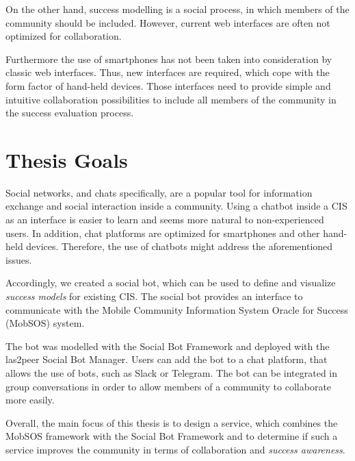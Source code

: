 On the other hand, success modelling is a social process, in which members of the community should be included. However, current web interfaces are often not optimized for collaboration.

Furthermore the use of smartphones has not been taken into consideration by classic web interfaces.
Thus, new interfaces are required, which cope with the form factor of hand-held devices. Those interfaces need to provide simple and intuitive collaboration possibilities to include all members of the community in the success evaluation process. 

\section{Thesis Goals}

Social networks, and chats specifically, are a popular tool for information exchange and social interaction inside a community.
Using a chatbot inside a CIS as an interface is easier to learn and seems more natural to non-experienced users.
In addition, chat platforms are optimized for smartphones and other hand-held devices. Therefore, the use of chatbots might address the aforementioned issues.

Accordingly, we created a social bot, which can be used to define and visualize \emph{success models} for existing CIS. The social bot provides an interface to communicate with the Mobile Community Information System Oracle for Success (MobSOS) system.

The bot was modelled with the Social Bot Framework and deployed with the las2peer Social Bot Manager. Users can add the bot to a chat platform, that allows the use of bots, such as Slack or Telegram.
The bot can be integrated in group conversations in order to allow members of a community to collaborate more easily.

Overall, the main focus of this thesis is to design a service, which combines the MobSOS framework with the Social Bot Framework and to determine if such a service improves the community in terms of collaboration and \emph{success awareness}.